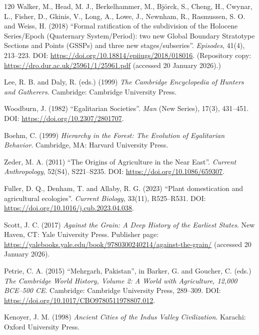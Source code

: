\begin{singlespace}
\begin{thebibliography}{120}
Walker, M., Head, M. J., Berkelhammer, M., Bj\"orck, S., Cheng, H., Cwynar, L., Fisher, D., Gkinis, V., Long, A., Lowe, J., Newnham, R., Rasmussen, S. O. and Weiss, H. (2018)
``Formal ratification of the subdivision of the Holocene Series/Epoch (Quaternary System/Period): two new Global Boundary Stratotype Sections and Points (GSSPs) and three new stages/subseries''.
\emph{Episodes}, 41(4), 213--223.
DOI: \url{https://doi.org/10.18814/epiiugs/2018/018016}.
(Repository copy: \url{https://dro.dur.ac.uk/25961/1/25961.pdf} (accessed 20 January 2026).)

Lee, R. B. and Daly, R. (eds.) (1999) \emph{The Cambridge Encyclopedia of Hunters and Gatherers}.
Cambridge: Cambridge University Press.

Woodburn, J. (1982) ``Egalitarian Societies''.
\emph{Man} (New Series), 17(3), 431--451.
DOI: \url{https://doi.org/10.2307/2801707}.

Boehm, C. (1999) \emph{Hierarchy in the Forest: The Evolution of Egalitarian Behavior}.
Cambridge, MA: Harvard University Press.

Zeder, M. A. (2011) ``The Origins of Agriculture in the Near East''.
\emph{Current Anthropology}, 52(S4), S221--S235.
DOI: \url{https://doi.org/10.1086/659307}.

Fuller, D. Q., Denham, T. and Allaby, R. G. (2023) ``Plant domestication and agricultural ecologies''.
\emph{Current Biology}, 33(11), R525--R531.
DOI: \url{https://doi.org/10.1016/j.cub.2023.04.038}.

Scott, J. C. (2017) \emph{Against the Grain: A Deep History of the Earliest States}.
New Haven, CT: Yale University Press.
Publisher page: \url{https://yalebooks.yale.edu/book/9780300240214/against-the-grain/} (accessed 20 January 2026).


Petrie, C. A. (2015) ``Mehrgarh, Pakistan'', in Barker, G. and Goucher, C. (eds.) \emph{The Cambridge World History, Volume 2: A World with Agriculture, 12,000 BCE--500 CE}. Cambridge: Cambridge University Press, 289--309. DOI: \url{https://doi.org/10.1017/CBO9780511978807.012}.

Kenoyer, J. M. (1998) \emph{Ancient Cities of the Indus Valley Civilization}.
Karachi: Oxford University Press.


\end{thebibliography}
\end{singlespace}
